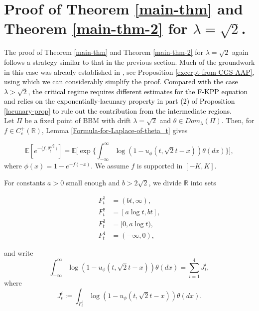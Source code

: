 \documentclass[a4paper,reqno]{amsart}%
\newcommand{\1}{\mathbf 1}
\theoremstyle{mine}
\numberwithin{theorem}{section}
\numberwithin{equation}{section}
\theoremstyle{remark}
\begin{document}
\section{Proof of Theorem \ref{main-thm} and Theorem \ref{main-thm-2} for $\lambda =\sqrt{2}$.} \label{Section proof critical}

The proof of Theorem \ref{main-thm} and Theorem \ref{main-thm-2} for $\lambda = \sqrt{2}$ again follows a strategy similar to that in the previous section. Much of the groundwork in this case was already established in \cite{Shekhar_Domain}, see Proposition \ref{excerpt-from-CGS-AAP}, using which we can considerably simplify the proof. \textcolor{black}{Compared with the case $\lambda>\sqrt{2}$, the critical regime requires different estimates for the F-KPP equation and relies on the exponentially-lacunary property in part (2) of Proposition \ref{lacunary-prop} to rule out the contribution from the intermediate regions.}\\ 

Let $\Pi$ be a fixed point of BBM with drift $\lambda = \sqrt{2}$ and $\theta \in Dom_{\lambda}(\Pi)$. Then, for $f\in C_c^+(\mathbb{R})$, Lemma \ref{Formula-for-Laplace-of-theta_t} gives 

\begin{equation}\label{Laplace-comp-using-F-KPP-4-critical}
\mathbb{E}[e^{-\langle f,\theta_t^{\sqrt{2}}\rangle}] = \mathbb{E}\biggl[\exp\biggl\{\int_{-\infty}^\infty\log(1- u_\phi(t, \sqrt{2} t -x))\theta(dx)\biggr\}\biggr],
\end{equation}
where $\phi(x) = 1-e^{-f(-x)}$. We assume $f$ is supported in $[-K, K]$.  

For constants $a>0$ small enough and $b>2\sqrt{2}$, we divide $\mathbb{R}$ into sets 
 
 \begin{align}
    \nonumber F_t^1 &= (bt, \infty), \\ \label{Def-sets-F} 
    F_t^2 &= [a \log t , bt] , \\ \nonumber
    F_t^3 &= [0, a\log t ), \\ \nonumber
    F_t^4 &= (-\infty, 0),  
\end{align}

and write 
\begin{equation}
    \int_{-\infty}^\infty\log(1- u_\phi(t, \sqrt{2} t -x))\theta(dx) = \sum_{i=1}^4 J_t^i,
\end{equation}
where
\begin{equation}
   J_t^i :=  \int_{F_t^i}\log(1- u_\phi(t, \sqrt{2} t -x))\theta(dx).
\end{equation}
\end{document}
